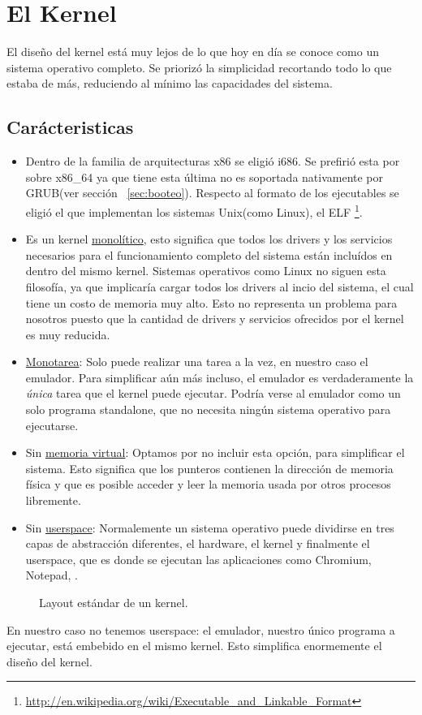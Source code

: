 \chapter{El Kernel}
El diseño del kernel está muy lejos de lo que hoy en día se conoce como un sistema operativo completo. Se priorizó la simplicidad recortando todo lo que estaba de más, reduciendo al mínimo las capacidades del sistema. 

\section{Carácteristicas}

\begin{itemize}
\item Dentro de la familia de arquitecturas x86 se eligió i686. Se prefirió esta por sobre x86\_64 ya que tiene esta última no es soportada nativamente por GRUB(ver sección ~\ref{sec:booteo}). Respecto al formato de los ejecutables se eligió el que implementan los sistemas Unix(como Linux), el ELF \footnote{\url{http://en.wikipedia.org/wiki/Executable_and_Linkable_Format}}.
\item Es un kernel \underline{monolítico}, esto significa que todos los drivers y los servicios necesarios para el funcionamiento completo del sistema están incluídos en dentro del mismo kernel. Sistemas operativos como Linux no siguen esta filosofía, ya que implicaría cargar todos los drivers al incio del sistema, el cual tiene un costo de memoria muy alto. Esto no representa un problema para nosotros puesto que la cantidad de drivers y servicios ofrecidos por el kernel es muy reducida.
\item \underline{Monotarea}: Solo puede realizar una tarea a la vez, en nuestro caso el emulador. Para simplificar aún más incluso, el emulador es verdaderamente la \emph{única} tarea que el kernel puede ejecutar. Podría verse al emulador como un solo programa standalone, que no necesita ningún sistema operativo para ejecutarse.
\item Sin \underline{memoria virtual}: Optamos por no incluir esta opción, para simplificar el sistema. Esto significa que los punteros contienen la dirección de memoria física y que es posible acceder y leer la memoria usada por otros procesos libremente.
\item Sin \underline{userspace}: Normalemente un sistema operativo puede dividirse en tres capas de abstracción diferentes, el hardware, el kernel y finalmente el userspace, que es donde se ejecutan las aplicaciones como Chromium, Notepad, \etc.
\end{itemize}
\begin{figure}[h]
\centering
\def\svgwidth{5cm}

\caption{Layout estándar de un kernel.}
\end{figure}
\FloatBarrier
En nuestro caso no tenemos userspace: el emulador, nuestro único programa a ejecutar, está embebido en el mismo kernel. Esto simplifica enormemente el diseño del kernel.

